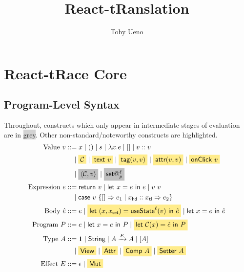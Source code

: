 \documentclass{article}
\title{React-tRanslation}
\author{Toby Ueno}
\makeatletter
\newcommand{\mf}[1]{\mathsf{#1}}
\newcommand{\mc}[1]{\mathcal{#1}}
\newcommand{\mb}[1]{\mathbf{#1}}
\newcommand{\mhl}[1]{\colorbox{LightGoldenrod1}{$#1$}}
\newcommand{\hl}[1]{\colorbox{LightGoldenrod1}{#1}}
\newcommand{\grey}[1]{\colorbox{lightgray}{#1}}
\newcommand{\mgrey}[1]{\colorbox{lightgray}{$#1$}}
\newcommand{\pair}[2]{\langle #1, #2 \rangle}
\newcommand{\arrow}[1]{\xrightarrow{#1}}
\newcommand{\ptp}{A}
\newcommand{\tone}{\mb{1}}
\newcommand{\tstr}{\mf{String}}
\newcommand{\tview}{\mf{View}}
\newcommand{\tattr}{\mf{Attr}}
\newcommand{\tcomp}[1]{\mf{Comp}\ #1}
\newcommand{\tset}[1]{\mf{Setter}\ #1}
\newcommand{\emut}{\mf{Mut}}
\newcommand{\C}{\mc{C}}
\newcommand{\vtxt}[1]{\mf{text}\ #1}
\newcommand{\vtag}[2]{\mf{tag}(#1, #2)}
\newcommand{\vattr}[2]{\mf{attr}(#1, #2)}
\newcommand{\vclick}[1]{\mf{onClick}\ #1}
\newcommand{\vset}[2]{\mf{set}@^{#1}_{#2}}
\newcommand{\elet}[3]{\mf{let}\ #1 = #2\ \mf{in}\ #3}
\newcommand{\eret}[1]{\mf{return}\ #1}
\newcommand{\ecase}[5]{\mf{case}\ #1\ \{#2 \Rightarrow #3 \mid #4 \Rightarrow #5\}}
\newcommand{\estate}[4]{\mf{let}\ (#1, #1_{\mf{set}}) = \mf{useState}^{#2}(#3)\ \mf{in}\ #4}
\makeatother
\begin{document}
\maketitle

\tableofcontents

\section{React-tRace Core}

\subsection{Program-Level Syntax}

Throughout, constructs which only appear in intermediate stages 
of evaluation are in \grey{grey}.
Other non-standard/noteworthy constructs are \hl{highlighted}.
\begin{align*}
\text{Value } v &::= x \mid () \mid s \mid \lambda x.e \mid [] \mid v :: v\\
&\quad\mid \mhl{\C} \mid \mhl{\vtxt{v}} \mid \mhl{\vtag{v}{v}}
\mid \mhl{\vattr{v}{v}} \mid \mhl{\vclick{v}}\\
&\quad\mid \mgrey{\pair{\C}{v}} \mid \mgrey{\vset{\ell}{p}}\\
\text{Expression } e &::= \eret{v} \mid \elet{x}{e}{e} \mid v\ v \\
&\quad\mid \ecase{v}{[]}{e_1}{x_\mf{hd} :: x_\mf{tl}}{e_2}\\
\text{Body }\hat{e} &::= e \mid \mhl{\estate{x}{\ell}{v}{\hat{e}}} \mid \elet{x}{e}{\hat{e}}\\
\text{Program } P &::= e \mid \elet{x}{e}{P} \mid \mhl{\elet{\C(x)}{\hat{e}}{P}}\\
\text{Type } \ptp &::= \tone \mid \tstr \mid \ptp \arrow{E} \ptp
\mid [\ptp] \\
&\quad\mid \mhl{\tview} \mid \mhl{\tattr}
\mid \mhl{\tcomp{\ptp}} \mid \mhl{\tset{\ptp}}\\
\text{Effect } E &::= \epsilon \mid \mhl{\emut}
\end{align*}
\end{document}
